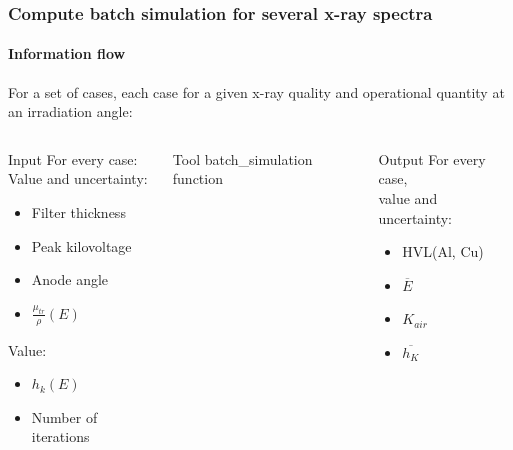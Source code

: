 \documentclass{beamer}
\newcommand{\highlight}[1]{{\color{blue} #1}}
\begin{document}
	\begin{frame}
		\frametitle{Compute batch simulation for several x-ray spectra}
		\framesubtitle{Information flow}
		For a \highlight{set of cases}, each case for a given x-ray quality and operational quantity at an irradiation angle:
		\begin{footnotesize}
			\begin{columns}[t]
				\begin{column}{0.35\textwidth}
					\begin{block}{Input}
						For every case:\\
						Value and uncertainty:
						\begin{itemize}
							\item Filter thickness
							\item Peak kilovoltage
							\item Anode angle
							\item $\frac{\mu_{tr}}{\rho}(E)$
						\end{itemize}
						Value:
						\begin{itemize}
							\item $h_k(E)$
							\item Number of iterations
						\end{itemize}
					\end{block}
				\end{column}
				\begin{column}{0.23\textwidth}
					\begin{block}{Tool}
						batch\_simulation function
					\end{block}
				\end{column}
				\begin{column}{0.32\textwidth}
					\begin{block}{Output}
						For every case, \\value and uncertainty:
						\begin{itemize}
							\item HVL(Al, Cu)
							\item $\overline{E}$
							\item $K_{air}$
							\item $\overline{h_K}$
						\end{itemize}
					\end{block}
				\end{column}
			\end{columns}
	\end{footnotesize}
	\end{frame}
	
\end{document}
